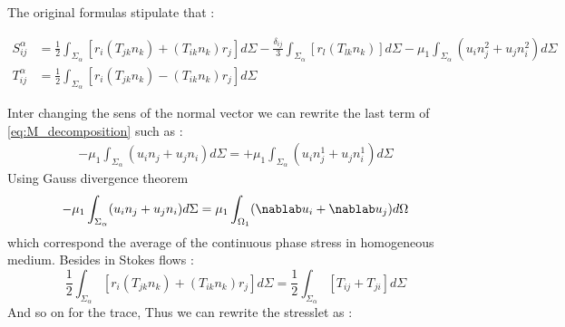 The original formulas stipulate that :

\begin{align}
    \label{eq:M_decomposition}
    S^\alpha_{ij} 
    &= \frac{1}{2}  \int_{\Sigma_\alpha} \left[
        r_i(T_{jk}n_k)
        + (T_{ik}n_k)r_j
        \right]d\Sigma
        - \frac{\delta_{ij}}{3}\int_{\Sigma_\alpha} \left[
            r_l(T_{lk}n_k)
    \right]d\Sigma
    -\mu_1 \int_{\Sigma_{\alpha}}
    (u_in_j^2 + u_jn_i^2)d\Sigma
    \\
    T^\alpha_{ij}
    &= \frac{1}{2}  \int_{\Sigma_\alpha} \left[
        r_i(T_{jk}n_k)
        - (T_{ik}n_k)r_j
    \right]d\Sigma \nonumber
\end{align}

Inter changing the sens of the normal vector we can rewrite the last term of \ref{eq:M_decomposition} such as :
\begin{align}
    - \mu_1 \int_{\Sigma_{\alpha}}
    (u_in_j + u_jn_i)d\Sigma
    = 
    + \mu_1 \int_{\Sigma_{\alpha}}
    (u_i n^1_j + u_jn^1_i)d\Sigma
\end{align}
Using Gauss divergence theorem 
\begin{align}
    - \mu_1 \int_{\Sigma_{\alpha}}
    (u_in_j + u_jn_i)d\Sigma
    = 
    \mu_1 \int_{\Omega_1}
    (\nablab u_i + \nablab u_j )d\Omega
\end{align}
which correspond the average of the continuous phase stress in homogeneous medium.
Besides in Stokes flows :
\begin{equation}
    \frac{1}{2}  \int_{\Sigma_\alpha} \left[
        r_i(T_{jk}n_k)
        + (T_{ik}n_k)r_j
        \right]d\Sigma
    =
    \frac{1}{2}  \int_{\Sigma_\alpha} \left[
        T_{ij}
        + T_{ji}
        \right]d\Sigma
\end{equation}
And so on for the trace, Thus we can rewrite the stresslet as : 
